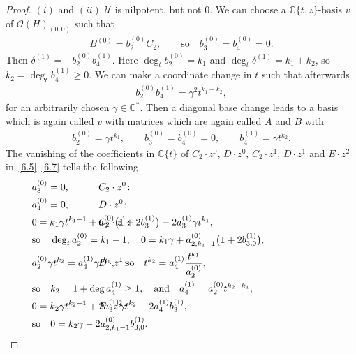\documentclass[10pt,a4paper]{amsart}
\numberwithin{equation}{section}
\numberwithin{figure}{section}
\newcommand{\C}{{\mathbb C}}
\newcommand{\OO}{{\mathcal O}}
\newcommand{\UU}{{\mathcal U}}
\newcommand{\uuuu}{\underline}
\begin{document}
\begin{proof}
$(i)$ and $(ii)$ $\UU$ is nilpotent, but not 0.
We can choose a $\C\{t,z\}$-basis $\uuuu{v}$ of
$\OO(H)_{(0,0)}$ such that
\begin{gather*}%
B^{(0)}=b_2^{(0)}C_2,\qquad \text{so}\quad
b_3^{(0)}=b_4^{(0)}=0.
\end{gather*}
Then $\delta^{(1)}=-b_2^{(0)}b_4^{(1)}$.
Here $\deg_tb_2^{(0)}=k_1$ and $\deg_t\delta^{(1)}=k_1+k_2$,
so $k_2=\deg_tb_4^{(1)} \geq 0$. We can make a
coordinate change in $t$ such that afterwards
\begin{gather*}
b_2^{(0)}b_4^{(1)}=\gamma^2t^{k_1+k_2},
\end{gather*}
for an arbitrarily chosen $\gamma\in\C^*$.
Then a diagonal base change leads to a basis which is
again called $\uuuu{v}$ with matrices which are again
called $A$ and $B$ with
\begin{gather*}%
b_2^{(0)}=\gamma t^{k_1},\qquad
b_3^{(0)}=b_4^{(0)}=0,\qquad
b_4^{(1)}=\gamma t^{k_2}.
\end{gather*}
The vanishing of the coefficients in $\C\{t\}$ of
$C_2\cdot z^0$, $D\cdot z^0$, $C_2\cdot z^1$, $D\cdot z^1$
and $E\cdot z^2$ in~\eqref{6.5}--\eqref{6.7}
tells the following
\begin{align*}
&C_2\cdot z^0\colon &&\hspace{-40mm} a_3^{(0)}=0,
\\
&D\cdot z^0\colon &&\hspace{-40mm}a_4^{(0)}=0,
\\
&C_2\cdot z^1\colon
&&\hspace{-40mm}0=k_1\gamma t^{k_1-1}+a_2^{(0)}\big(1+2b_3^{(1)}\big)-2a_3^{(1)}\gamma t^{k_1},
\\
&&&\hspace{-40mm}\text{so}\quad \deg_t a_2^{(0)}=k_1-1, \quad
0=k_1\gamma +a_{2,k_1-1}^{(0)}\big(1+2b_{3,0}^{(1)}\big),
\\
&D\cdot z^1\colon &&\hspace{-40mm}a_2^{(0)}\gamma t^{k_2}=a_4^{(1)}\gamma t^{k_1},\quad
\text{so}\quad t^{k_2}=a_4^{(1)}\frac{t^{k_1}}{a_2^{(0)}},
\\
&&&\hspace{-40mm}\text{so}\quad k_2=1+\deg a_4^{(1)}\geq 1,\quad\text{and}\quad
a_4^{(1)}=a_2^{(0)}t^{k_2-k_1},
\\
&E\cdot z^2\colon &&\hspace{-40mm}
0=k_2\gamma t^{k_2-1}+2a_3^{(1)}\gamma t^{k_2}-2a_4^{(1)}b_3^{(1)},
\\
&&&\hspace{-40mm} \text{so}\quad 0=k_2\gamma -2a_{2,k_1-1}^{(0)}b_{3,0}^{(1)}.

\end{align*}
\end{proof}
\end{document}
